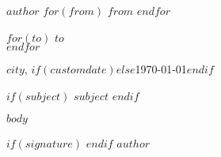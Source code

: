 \documentclass[$fontsize$, a4paper]{article}
\begin{document}
\small
\textsc{\textbf{$author$}}
$for(from)$
  \noindent \textbullet{} \textsc{$from$}
$endfor$

\vspace{1em}

\normalsize \scshape \noindent
$for(to)$
  $to$\\
$endfor$

\vspace{3em}

\upshape
\rmfamily

\begin{flushright}
$city$, $if(customdate)$$else$\today$endif$
\end{flushright}

\vspace{1em}

$if(subject)$
  \textbf{$subject$}
$endif$

\vspace{1em}

$body$

\begin{flushright}
$if(signature)$
$endif$
$author$
\end{flushright}

\end{document}
